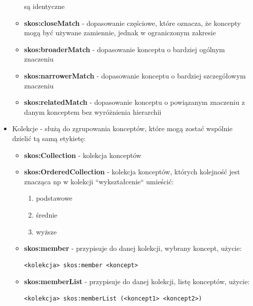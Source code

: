 \documentclass[12pt,a4paper,notitlepage]{article}
\begin{document}
\begin{itemize}
\begin{itemize}
          są identyczne
        \item \textbf{skos:closeMatch} - dopasowanie częściowe, które oznacza,
          że koncepty mogą być używane zamiennie, jednak w ograniczonym
          zakresie
        \item \textbf{skos:broaderMatch} - dopasowanie konceptu o bardziej
          ogólnym znaczeniu
        \item \textbf{skos:narrowerMatch} - dopasowanie konceptu o bardziej
          szczegółowym znaczeniu
        \item \textbf{skos:relatedMatch} - dopasowanie konceptu o powiązanym
          znaczeniu z danym konceptem bez wyróżnienia hierarchii
      \end{itemize}
    \item Kolekcje - służą do zgrupowania konceptów, które mogą zostać wspólnie
      dzielić tą samą etykietę:
      \begin{itemize}
        \item \textbf{skos:Collection} - kolekcja konceptów
        \item \textbf{skos:OrderedCollection} - kolekcja konceptów, których
          kolejność jest znacząca np w kolekcji ``wykształcenie`` umieścić:
          \begin{enumerate}
            \item podstawowe
            \item średnie
            \item wyższe
          \end{enumerate}
        \item \textbf{skos:member} - przypisuje do danej kolekcji, wybrany
          koncept, użycie:
\begin{verbatim}
<kolekcja> skos:member <koncept>
\end{verbatim}
        \item \textbf{skos:memberList} - przypisuje do danej kolekcji, listę
          konceptów, użycie:
\begin{verbatim}
<kolekcja> skos:memberList (<koncept1> <koncept2>)
\end{verbatim}
      \end{itemize}
\end{itemize}
{}
\end{document}

